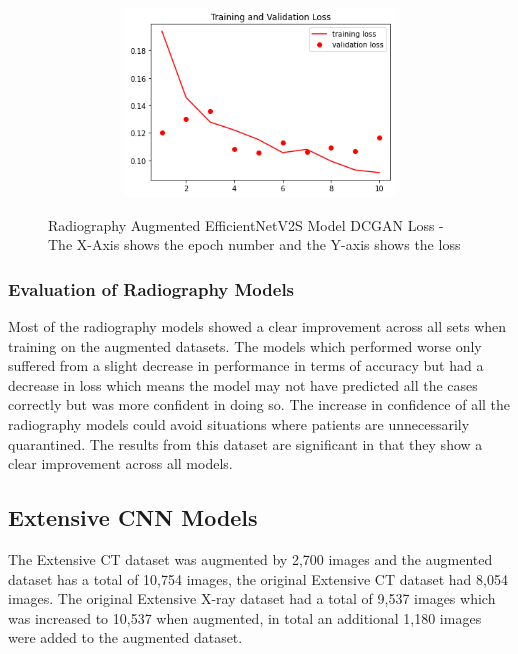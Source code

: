  \begin{figure}[H]
    \centering
    \includegraphics[width=1\textwidth,height=5cm,keepaspectratio]{Images/EfficientNetV2SBaselineTrainingValidationLossRadiographyAugmentedDCGAN.png}\\
    \caption{Radiography Augmented EfficientNetV2S Model DCGAN Loss - The X-Axis shows the epoch number and the Y-axis shows the loss}
    \label{fig:Radiography Augmented EfficientNetV2S Model DCGAN Loss}
\end{figure}
\subsubsection{Evaluation of Radiography Models}
Most of the radiography models showed a clear improvement across all sets when training on the augmented datasets.  The models which performed worse only suffered from a slight decrease in performance in terms of accuracy but had a decrease in loss which means the model may not have predicted all the cases correctly but was more confident in doing so.  The increase in confidence of all the radiography models could avoid situations where patients are unnecessarily quarantined.  The results from this dataset are significant in that they show a clear improvement across all models.
\subsection{Extensive CNN Models}
The Extensive CT dataset was augmented by 2,700 images and the augmented dataset has a total of 10,754 images, the original Extensive CT dataset had 8,054 images.  The original Extensive X-ray dataset had a total of 9,537 images which was increased to 10,537 when augmented, in total an additional 1,180 images were added to the augmented dataset.
